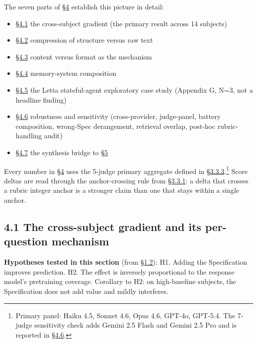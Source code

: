 The seven parts of \hyperref[results]{§4} establish this picture in detail:

\begin{itemize}
\tightlist
\item
  \hyperref[the-cross-subject-gradient-and-its-per-question-mechanism]{§4.1} the cross-subject gradient (the primary result across 14
  subjects)
\item
  \hyperref[compression-structure-vs.-raw-text]{§4.2} compression of structure versus raw text
\item
  \hyperref[mechanism-correct-content-not-format]{§4.3} content versus format as the mechanism
\item
  \hyperref[memory-system-composition]{§4.4} memory-system composition
\item
  \hyperref[exploratory-case-study-letta-stateful-agent-n3-post-hoc]{§4.5} the Letta stateful-agent exploratory case study (Appendix G, N=3,
  not a headline finding)
\item
  \hyperref[robustness-and-sensitivity]{§4.6} robustness and sensitivity (cross-provider, judge-panel, battery
  composition, wrong-Spec derangement, retrieval overlap, post-hoc
  rubric-handling audit)
\item
  \hyperref[summary-of-4]{§4.7} the synthesis bridge to \hyperref[discussion]{§5}
\end{itemize}

Every number in \hyperref[results]{§4} uses the 5-judge primary aggregate defined in
\hyperref[calibration]{§3.3.3}.\footnote{Primary panel: Haiku 4.5, Sonnet 4.6, Opus 4.6, GPT-4o,
  GPT-5.4. The 7-judge sensitivity check adds Gemini 2.5 Flash and
  Gemini 2.5 Pro and is reported in \hyperref[robustness-and-sensitivity]{§4.6}.} Score deltas are read through
the anchor-crossing rule from \hyperref[score-interpretation]{§3.3.1}: a delta that crosses a rubric
integer anchor is a stronger claim than one that stays within a single
anchor.

\hypertarget{the-cross-subject-gradient-and-its-per-question-mechanism}{%
\subsection{4.1 The cross-subject gradient and its per-question
mechanism}\label{the-cross-subject-gradient-and-its-per-question-mechanism}}

\textbf{Hypotheses tested in this section} (from \hyperref[what-we-tested]{§1.2}): H1. Adding the
Specification improves prediction. H2. The effect is inversely
proportional to the response model's pretraining coverage. Corollary to
H2: on high-baseline subjects, the Specification does not add value and
mildly interferes.

